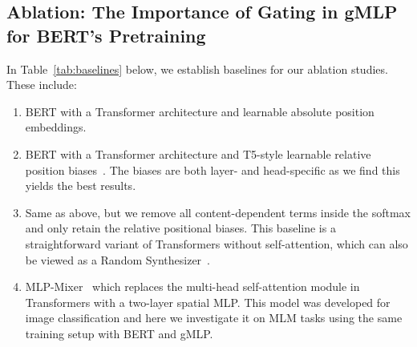 \documentclass{article}
\newcommand{\gffn}{gMLP\xspace}
\begin{document}
\subsection{Ablation: The Importance of Gating in \gffn for BERT's Pretraining}
\label{sec:baselines}

In Table~\ref{tab:baselines} below, we establish baselines for our ablation studies.
These include:
\begin{enumerate}
\item BERT with a Transformer architecture and learnable absolute position embeddings.
\item BERT with a Transformer architecture and T5-style learnable relative position biases~\cite{raffel2019exploring}.
The biases are both layer- and head-specific as we find this yields the best results.
\item Same as above, but we remove all content-dependent terms inside the softmax and only retain the relative positional biases. This baseline is a straightforward variant of Transformers without self-attention,
which can also be viewed as a Random Synthesizer~\cite{tay2020synthesizer}.
\item MLP-Mixer~\cite{tolstikhin2021mlpmixer} which replaces the multi-head self-attention module in Transformers with a two-layer spatial MLP.
This model was developed for image classification and here we investigate it on MLM tasks using the same training setup with BERT and gMLP.
\end{enumerate}
\end{document}
